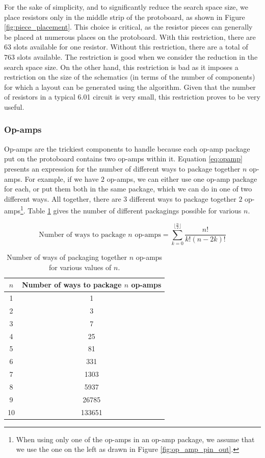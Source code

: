 For the sake of simplicity, and to significantly reduce the search space size, we
place resistors only in the middle strip of the protoboard, as shown in Figure
\ref{fig:piece_placement}. This choice is critical,
as the resistor pieces can generally be placed at numerous places on the
protoboard.
With this restriction, there are $63$ slots available for one resistor. Without
this restriction, there are a total of $763$ slots available. The restriction is
good when we consider the reduction in the search space size. On the other hand,
this restriction is bad as it imposes a restriction on the size of the
schematics (in terms of the number of components) for which a layout can be
generated using the algorithm.
Given that the number
of resistors in a typical 6.01 circuit is very
small, this restriction proves to be very useful.

\subsubsection{Op-amps}

Op-amps are the trickiest components to handle because each op-amp package put
on the protoboard contains two op-amps within it. Equation
\ref{eq:opamp} presents an expression for the number of
different ways to package together $n$ op-amps. For example, if we have $2$
op-amps, we can either use one op-amp package for each, or put them both in the
same package, which we can do in one of two different ways. All together, there
are $3$ different ways to package together $2$ op-amps\footnote{When using only
one of the op-amps in an op-amp package, we assume that we use the one on the
left as drawn in Figure \ref{fig:op_amp_pin_out}.}.
Table \ref{tb:opamp} gives the number of different packagings possible for
various $n$.

\begin{equation}
\text{Number of ways to package $n$ op-amps} =
\sum\limits_{k=0}^{\lfloor\frac{n}{2}\rfloor}{\frac{n!}{k!(n - 2k)!}}
\label{eq:opamp}
\end{equation}

\begin{table}
\begin{center}
\begin{singlespace}
\begin{tabular}{c | c}
$n$ & Number of ways to package $n$ op-amps \\
\hline
\hline
1 & 1 \\
2 & 3 \\
3 & 7 \\
4 & 25 \\
5 & 81 \\
6 & 331 \\
7 & 1303 \\
8 & 5937 \\
9 & 26785 \\
10 & 133651
\end{tabular}
\end{singlespace}
\end{center}
\caption[Op-amp packaging possibilities]{Number of ways of packaging together
$n$ op-amps for various values of $n$.}
\label{tb:opamp}
\end{table}

